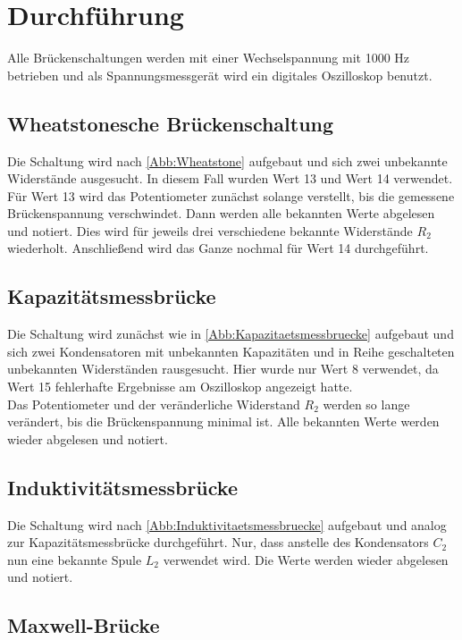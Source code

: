 \section{Durchführung}
\label{sec:Durchführung}
Alle Brückenschaltungen werden mit einer Wechselspannung mit 1000 Hz betrieben und als Spannungsmessgerät wird
ein digitales Oszilloskop benutzt.

\subsection{Wheatstonesche Brückenschaltung}

Die Schaltung wird nach \autoref{Abb:Wheatstone} aufgebaut und sich zwei unbekannte Widerstände ausgesucht. In diesem
Fall wurden Wert 13 und Wert 14 verwendet. Für Wert 13 wird das Potentiometer zunächst solange verstellt, bis die gemessene Brückenspannung
verschwindet. Dann werden alle bekannten Werte abgelesen und notiert. Dies wird für jeweils drei verschiedene bekannte 
Widerstände $R_2$ wiederholt. Anschließend wird das Ganze nochmal für Wert 14 durchgeführt.

\subsection{Kapazitätsmessbrücke}

Die Schaltung wird zunächst wie in \autoref{Abb:Kapazitaetsmessbruecke} aufgebaut und sich zwei Kondensatoren mit unbekannten
Kapazitäten und in Reihe geschalteten unbekannten Widerständen rausgesucht. Hier wurde nur Wert 8 verwendet, da Wert 15 fehlerhafte Ergebnisse
am Oszilloskop angezeigt hatte. \\
Das Potentiometer und der veränderliche Widerstand $R_2$ werden so lange verändert, bis die Brückenspannung minimal ist. Alle bekannten 
Werte werden wieder abgelesen und notiert.

\subsection{Induktivitätsmessbrücke}

Die Schaltung wird nach \autoref{Abb:Induktivitaetsmessbruecke} aufgebaut und analog zur Kapazitätsmessbrücke durchgeführt. Nur, dass
anstelle des Kondensators $C_2$ nun eine bekannte Spule $L_2$ verwendet wird. Die Werte werden wieder abgelesen und notiert.

\subsection{Maxwell-Brücke}

